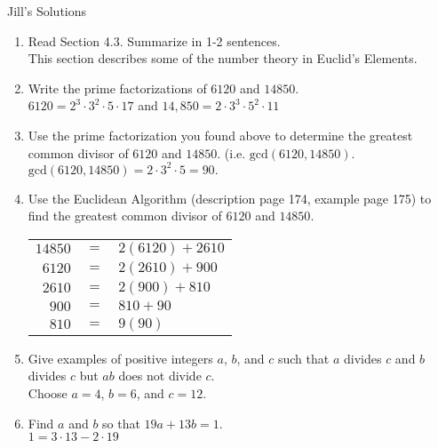 \documentclass[12pt]{article}
\begin{document}
\begin{center} Jill's Solutions \end{center}

\begin{enumerate}
\item Read Section 4.3. Summarize in 1-2 sentences.\\

This section describes some of the number theory in Euclid's Elements.
\vfill
\item Write the prime factorizations of $6120$ and $14850.$\\

$6120=2^3\cdot3^2\cdot 5 \cdot 17$ and $14,850=2 \cdot 3^3 \cdot 5^2\cdot 11$\\
\vfill
\item Use the prime factorization you found above to determine the greatest common divisor of $6120$ and $14850.$ (i.e. $\text{gcd}(6120,14850).$\\

$\text{gcd}(6120,14850)=2 \cdot 3^2 \cdot 5=90.$
\vfill
\item Use the Euclidean Algorithm (description page 174, example page 175) to find the greatest common divisor of $6120$ and $14850.$ \\

\begin{tabular}{rcl}
$14850$&$=$&$2(6120)+2610$\\
$6120$&$=$&$2(2610)+900$\\
$2610$&$=$&$2(900)+810$\\
$900$&$=$&$810+90$\\
$810$&$=$&$9(90)$\\
\end{tabular}
\vfill
\item Give examples of positive integers $a$, $b$, and $c$ such that $a$ divides $c$ and $b$ divides $c$ but $ab$ does not divide $c$.\\

Choose $a=4$, $b=6$, and $c=12.$
\vfill
\item Find $a$ and $b$ so that $19a+13b=1.$\\

$1=3 \cdot 13 - 2 \cdot 19$
\vfill
\end{enumerate}
\end{document}

